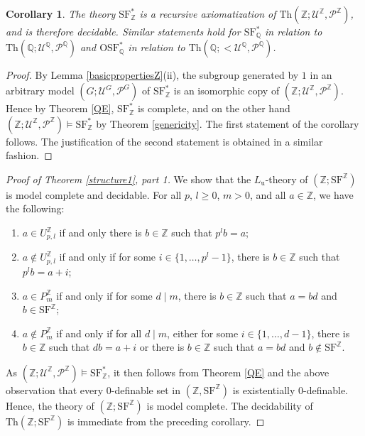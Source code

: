 \documentclass[letterpaper]{amsart}
\newcommand{\qq}{\mathbb{Q}}
\newcommand{\zz}{\mathbb{Z}}
\newcommand{\sU}{\mathscr{U}}
\newcommand{\sP}{\mathscr{P}}
\newcommand{\SF}{\mathrm{SF}^\zz}
\newcommand{\TSFZ}{\mathrm{SF}^*_{\zz}}
\newcommand{\TSFQ}{\mathrm{SF}^*_{\qq}}
\newcommand{\TOSFQ}{\mathrm{OSF}^*_{\qq}}
\newtheorem{cor}[thm]{Corollary}
\begin{document}
\begin{cor} \label{Completeness}
The theory $\TSFZ$ is a recursive axiomatization of $\mathrm{Th}(\zz; \sU^\zz, \sP^\zz)$, and is therefore decidable. Similar statements hold for  $\TSFQ$ in relation to $\mathrm{Th}(\qq; \sU^\qq, \sP^\qq)$ and $\TOSFQ$ in relation to $\mathrm{Th}(\qq; < \sU^\qq, \sP^\qq)$.
\end{cor}
\begin{proof}
By Lemma \ref{basicpropertiesZ}(ii), the  subgroup generated by $1$ in an arbitrary model $(G; \sU^G, \sP^G)$ of $\TSFZ$ is an isomorphic copy of $(\zz; \sU^\zz, \sP^\zz)$. Hence by Theorem \ref{QE}, $\TSFZ$ is complete, and  on the other hand $(\zz; \sU^\zz, \sP^\zz) \models \TSFZ $ by Theorem \ref{genericity}. The first statement of the corollary  follows.  The justification of the second statement is obtained in a similar fashion.
\end{proof}

\begin{proof}[Proof of Theorem \ref{structure1}, part 1] We show that  the $L_{\mathrm{u}}$-theory of $(\zz; \SF)$ is model complete and decidable. For all $p$, $l\geq 0$, $m>0$, and all $a \in \zz$, we have the following:
\begin{enumerate}
\item $a \in U^\zz_{p, l}$ if and only there is $b\in \zz$ such that $p^lb =a$;
\item $a \notin U^\zz_{p, l}$ if and only if for some $i \in \{1, \ldots, p^l-1\}$, there is $b\in \zz$ such that $p^lb =a+i$;
\item $a \in P^\zz_m$ if and only if for some $d \mid m$, there is $b\in \zz$ such that $a =bd$ and $b\in \SF$;
\item  $a \notin P^\zz_m$ if and only if for all $d \mid m$, either for some $i \in \{1, \ldots, d-1\}$, there is $b\in \zz$ such that $db =a+i$ or there is $b \in \zz$ such that $a =bd$ and $b \notin \SF$.
\end{enumerate}
As $(\zz; \sU^\zz, \sP^\zz) \models \TSFZ$, it then follows from Theorem \ref{QE} and the above observation that every $0$-definable set in $(\zz, \SF)$ is existentially $0$-definable. Hence, the theory of $(\zz; \SF)$ is model complete. The decidability of  $\text{Th}(\zz; \SF)$ is immediate from the preceding corollary.
\end{proof}
\end{document}
